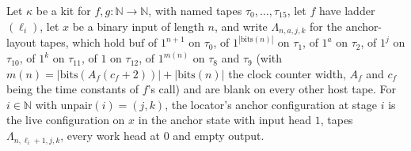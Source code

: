 \begin{definition}
\label{Turing.NTimeDiag.qyAt}
\leanok
{}
Let $\kappa$ be a kit for $f, g : \mathbb{N} \to \mathbb{N}$, with named tapes $\tau_0, \dots,
\tau_{15}$, let $f$ have ladder $(\ell_i)$, let $x$ be a binary input of length $n$, and write
$\Lambda_{n,a,j,k}$ for the anchor-layout tapes, which hold $\mathrm{buf}$ of $1^{n+1}$ on
$\tau_0$, of $1^{|\mathrm{bits}(n)|}$ on $\tau_1$, of $1^a$ on $\tau_2$, of $1^j$ on $\tau_{10}$,
of $1^k$ on $\tau_{11}$, of $1$ on $\tau_{12}$, of $1^{m(n)}$ on $\tau_8$ and $\tau_9$ (with $m(n)
= |\mathrm{bits}(A_f(c_f + 2))| + |\mathrm{bits}(n)|$ the clock counter width, $A_f$ and $c_f$
being the time constants of $f$'s call) and are blank on every other host tape. For $i \in
\mathbb{N}$ with $\mathrm{unpair}(i) = (j, k)$, the locator's anchor configuration at stage $i$ is
the live configuration on $x$ in the anchor state with input head $1$, tapes $\Lambda_{n,\ell_i +
1,j,k}$, every work head at $0$ and empty output.
\end{definition}


